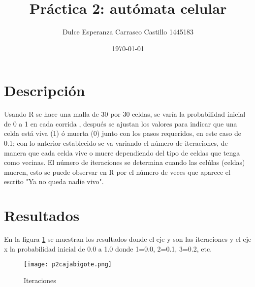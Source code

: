 \documentclass{article}
\author{Dulce Esperanza Carrasco Castillo 1445183}
\title{Práctica 2: autómata celular}
\date{\today}
\begin{document}
\maketitle


\section{Descripción}
Usando R se hace una malla de 30 por 30 celdas, se varía la probabilidad inicial de 0 a 1 en cada corrida \cite{elisaweb}, después se ajustan los valores para indicar que una celda está viva (1) ó muerta (0) junto con los pasos requeridos, en este caso de 0.1; con lo anterior establecido se va variando el número de iteraciones, de manera que cada celda vive o muere dependiendo del tipo de celdas que tenga como vecinas. El número de iteraciones se determina cuando las celúlas (celdas) mueren, esto se puede observar en R por el número de veces que aparece el escrito "Ya no queda nadie vivo".

\section{Resultados}

En la figura \ref{cajabigote} se muestran los resultados donde el eje y son las iteraciones y el eje x la probabilidad inicial de 0.0 a 1.0 donde 1=0.0, 2=0.1, 3=0.2, etc.

\begin{figure}
\centering\texttt{[image: p2cajabigote.png]}
\caption{Iteraciones}
\label{cajabigote}
\end{figure}













\end{document}
